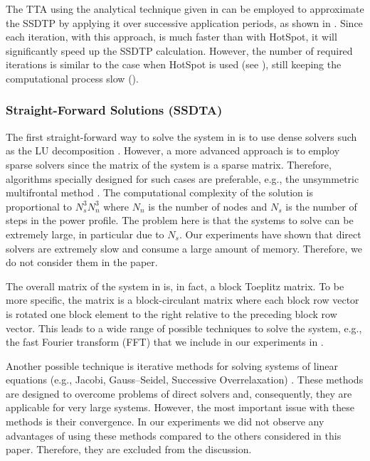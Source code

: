 The TTA using the analytical technique given in  can be
employed to approximate the SSDTP by applying it over successive application
periods, as shown in . Since each iteration,
with this approach, is much faster than with HotSpot, it will significantly
speed up the SSDTP calculation. However, the number of required iterations is
similar to the case when HotSpot is used (see ), still
keeping the computational process slow ().

\subsubsection{Straight-Forward Solutions (SSDTA)} 

The first straight-forward way to solve the system in  is to use
dense solvers such as the LU decomposition \cite{press2007}. However, a more
advanced approach is to employ sparse solvers since the matrix of the system is
a sparse matrix. Therefore, algorithms specially designed for such cases are
preferable, e.g., the unsymmetric multifrontal method \cite{davis2004}. The
computational complexity of the solution is proportional to $N_s^3 N_n^3$
\cite{press2007} where $N_n$ is the number of nodes and $N_s$ is the number of
steps in the power profile. The problem here is that the systems to solve can be
extremely large, in particular due to $N_s$. Our experiments have shown that
direct solvers are extremely slow and consume a large amount of memory.
Therefore, we do not consider them in the paper.

The overall matrix of the system in  is, in fact, a block Toeplitz
matrix. To be more specific, the matrix is a block-circulant matrix where each
block row vector is rotated one block element to the right relative to the
preceding block row vector. This leads to a wide range of possible techniques to
solve the system, e.g., the fast Fourier transform (FFT) \cite{mazancourt1983}
that we include in our experiments in .

Another possible technique is iterative methods for solving systems of linear
equations (e.g., Jacobi, Gauss--Seidel, Successive Overrelaxation)
\cite{press2007}. These methods are designed to overcome problems of direct
solvers and, consequently, they are applicable for very large systems. However,
the most important issue with these methods is their convergence. In our
experiments we did not observe any advantages of using these methods compared to
the others considered in this paper. Therefore, they are excluded from the
discussion.

